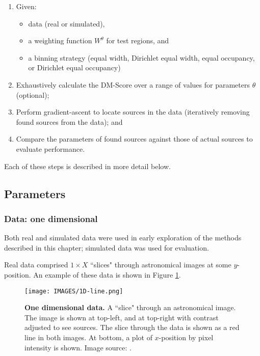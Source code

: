 \begin{enumerate}
\item{Given:}
  \begin{itemize}
  \item{data (real or simulated),}
  \item{a weighting function $W^{\theta}$ for test regions, and}
  \item{a binning strategy (equal width, Dirichlet equal width, equal occupancy, or Dirichlet equal occupancy)}
  \end{itemize}
\item{Exhaustively calculate the DM-Score over a range of values for parameters $\theta$ (optional);}
\item{Perform gradient-ascent to locate sources in the data (iteratively removing found sources from the data); and}
\item{Compare the parameters of found sources against those of actual sources to evaluate performance.}
\end{enumerate}

Each of these steps is described in more detail below.

\subsection{Parameters}

\subsubsection{Data: one dimensional}\label{sec:1d-methods-data}
Both real and simulated data were used in early exploration of the methods described in this chapter; simulated data was used for evaluation.

Real data comprised $1 \times X$ ``slices" through astronomical images at some $y$-position. An example of these data is shown in Figure \ref{fig:1d-real}. 

\begin{figure}
\centering
\texttt{[image: IMAGES/1D-line.png]}
\caption[One dimensional data from a two dimensional image]{\textbf{One dimensional data.} A ``slice" through an astronomical image. The image is shown at top-left, and at top-right with contrast adjusted to see sources. The slice through the data is shown as a red line in both images. At bottom, a plot of $x$-position by pixel intensity is shown. Image source: \cite{saripalli2012atlbs,subrahmanyan2010atlbs}.}
\label{fig:1d-real}
\end{figure}


